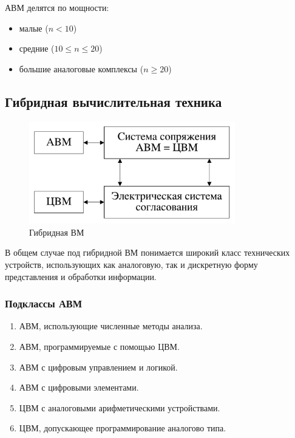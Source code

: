 АВМ делятся по мощности:

\begin{itemize}
    \item малые ($n < 10$)
    \item средние ($10 \le n \le 20$)
    \item большие аналоговые комплексы ($n \geq 20$)
\end{itemize}

\subsection{Гибридная вычислительная техника}

\begin{figure}[H]
    \centering
    \includegraphics[width=0.8\textwidth]{img/content/04_technical/hybrid.pdf}
    \caption{Гибридная ВМ}
    \label{fig:hybrid}
\end{figure}

В общем случае под гибридной ВМ понимается широкий класс технических устройств, использующих как аналоговую, так и дискретную форму представления и обработки информации.

\subsubsection{Подклассы АВМ}

\begin{enumerate}
    \item АВМ, использующие численные методы анализа.
    \item АВМ, программируемые с помощью ЦВМ.
    \item АВМ с цифровым управлением и логикой.
    \item АВМ с цифровыми элементами.
    \item ЦВМ с аналоговыми арифметическими устройствами.
    \item ЦВМ, допускающее программирование аналогово типа.
\end{enumerate}
